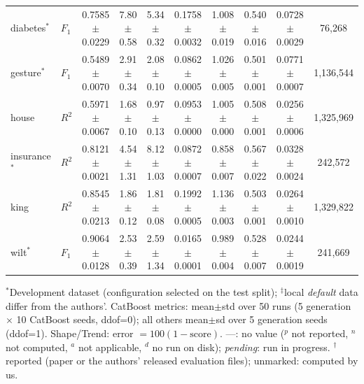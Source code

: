 \begin{table}[t]
{\begin{tabular}{llcccccccc}
diabetes$^{*}$ & $F_1$ & 0.7585{\scriptsize$\pm$0.0229} & 7.80{\scriptsize$\pm$0.58} & 5.34{\scriptsize$\pm$0.32} & 0.1758{\scriptsize$\pm$0.0032} & 1.008{\scriptsize$\pm$0.019} & 0.540{\scriptsize$\pm$0.016} & 0.0728{\scriptsize$\pm$0.0029} & 76{,}268 \\
gesture$^{*}$ & $F_1$ & 0.5489{\scriptsize$\pm$0.0070} & 2.91{\scriptsize$\pm$0.34} & 2.08{\scriptsize$\pm$0.10} & 0.0862{\scriptsize$\pm$0.0005} & 1.026{\scriptsize$\pm$0.005} & 0.501{\scriptsize$\pm$0.001} & 0.0771{\scriptsize$\pm$0.0007} & 1{,}136{,}544 \\
house & $R^2$ & 0.5971{\scriptsize$\pm$0.0067} & 1.68{\scriptsize$\pm$0.10} & 0.97{\scriptsize$\pm$0.13} & 0.0953{\scriptsize$\pm$0.0000} & 1.005{\scriptsize$\pm$0.000} & 0.508{\scriptsize$\pm$0.001} & 0.0256{\scriptsize$\pm$0.0006} & 1{,}325{,}969 \\
insurance$^{*}$ & $R^2$ & 0.8121{\scriptsize$\pm$0.0021} & 4.54{\scriptsize$\pm$1.31} & 8.12{\scriptsize$\pm$1.03} & 0.0872{\scriptsize$\pm$0.0007} & 0.858{\scriptsize$\pm$0.007} & 0.567{\scriptsize$\pm$0.022} & 0.0328{\scriptsize$\pm$0.0024} & 242{,}572 \\
king & $R^2$ & 0.8545{\scriptsize$\pm$0.0213} & 1.86{\scriptsize$\pm$0.12} & 1.81{\scriptsize$\pm$0.08} & 0.1992{\scriptsize$\pm$0.0005} & 1.136{\scriptsize$\pm$0.003} & 0.503{\scriptsize$\pm$0.001} & 0.0264{\scriptsize$\pm$0.0010} & 1{,}329{,}822 \\
wilt$^{*}$ & $F_1$ & 0.9064{\scriptsize$\pm$0.0128} & 2.53{\scriptsize$\pm$0.39} & 2.59{\scriptsize$\pm$1.34} & 0.0165{\scriptsize$\pm$0.0001} & 0.989{\scriptsize$\pm$0.004} & 0.528{\scriptsize$\pm$0.007} & 0.0244{\scriptsize$\pm$0.0019} & 241{,}669 \\
\bottomrule
\end{tabular}}
\par\smallskip\footnotesize $^{*}$Development dataset (configuration selected on the test split); $^\ddagger$local \textit{default} data differ from the authors'. CatBoost metrics: mean$\pm$std over 50 runs (5 generation $\times$ 10 CatBoost seeds, ddof=0); all others mean$\pm$sd over 5 generation seeds (ddof=1). Shape/Trend: error $=100(1-\mathrm{score})$. ---: no value ($^{p}$ not reported, $^{n}$ not computed, $^{a}$ not applicable, $^{d}$ no run on disk); \emph{pending}: run in progress. $^\dagger$reported (paper or the authors' released evaluation files); unmarked: computed by us.
\end{table}
